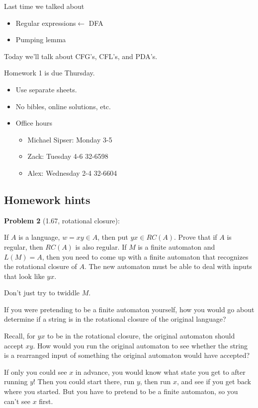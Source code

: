 
Last time we talked about
\begin{itemize}
\item
Regular expressions$\leftarrow$ DFA
\item
Pumping lemma
\end{itemize}
Today we'll talk about CFG's, CFL's, and PDA's.

Homework 1 is due Thursday.
\begin{itemize}
\item
Use separate sheets.
\item
No bibles, online solutions, etc.
\item
Office hours
\begin{itemize}
\item
Michael Sipser: Monday 3-5
\item
Zack: Tuesday 4-6 32-6598
\item
Alex: Wednesday 2-4 32-6604
\end{itemize}
\end{itemize}
\subsection*{Homework hints}
\noindent
\textbf{Problem 2} (1.67, rotational closure):

If $A$ is a language, $w=xy\in A$, then put $yx\in RC(A)$. Prove that if $A$ is regular, then $RC(A)$ is also regular. If $M$ is a finite automaton and $L(M)=A$, then you need to come up with a finite automaton that recognizes the rotational closure of $A$. The new automaton must be able to deal with inputs that look like $yx$.

Don't just try to twiddle $M$.

If you were pretending to be a finite automaton yourself, how you would go about determine if a string is in the rotational closure of the original language?

Recall, for $yx$ to be in the rotational closure, the original automaton should accept $xy$. How would you run the original automaton to see whether the string is a rearranged input of something the original automaton would have accepted?

If only you could see $x$ in advance, you would know what state you get to after running $y$! Then you could start there, run $y$, then run $x$, and see if you get back where you started. But you have to pretend to be a finite automaton, so you can't see $x$ first.

